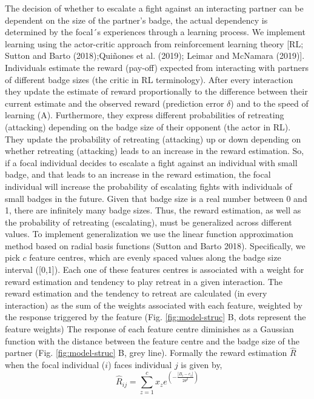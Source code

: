 \documentclass[
  12pt,
]{article}
\begin{document}
The decision of whether to escalate a fight against an interacting
partner can be dependent on the size of the partner's badge, the actual
dependency is determined by the focal´s experiences through a learning
process. We implement learning using the actor-critic approach from
reinforcement learning theory {[}RL; Sutton and Barto (2018);Quiñones et
al. (2019); Leimar and McNamara (2019){]}. Individuals estimate the
reward (pay-off) expected from interacting with partners of different
badge sizes (the critic in RL terminology). After every interaction they
update the estimate of reward proportionally to the difference between
their current estimate and the observed reward (prediction error
\(\delta\)) and to the speed of learning (\(\mathrm{A}\)). Furthermore,
they express different probabilities of retreating (attacking) depending
on the badge size of their opponent (the actor in RL). They update the
probability of retreating (attacking) up or down depending on whether
retreating (attacking) leads to an increase in the reward estimation.
So, if a focal individual decides to escalate a fight against an
individual with small badge, and that leads to an increase in the reward
estimation, the focal individual will increase the probability of
escalating fights with individuals of small badges in the future. Given
that badge size is a real number between 0 and 1, there are infinitely
many badge sizes. Thus, the reward estimation, as well as the
probability of retreating (escalating), must be generalized across
different values. To implement generalization we use the linear function
approximation method based on radial basis functions (Sutton and Barto
2018). Specifically, we pick \(c\) feature centres, which are evenly
spaced values along the badge size interval ({[}0,1{]}). Each one of
these features centres is associated with a weight for reward estimation
and tendency to play retreat in a given interaction. The reward
estimation and the tendency to retreat are calculated (in every
interaction) as the sum of the weights associated with each feature,
weighted by the response triggered by the feature (Fig.
\ref{fig:model-struc} B, dots represent the feature weights) The
response of each feature centre diminishes as a Gaussian function with
the distance between the feature centre and the badge size of the
partner (Fig. \ref{fig:model-struc} B, grey line). Formally the reward
estimation \(\hat{R}\) when the focal individual (\(i\)) faces
individual \(j\) is given by,\\
\begin{equation}
\hat{R}_{ij} =  \sum_{z=1}^{c} x_z e^{(-\frac{|B_i-c_z|}{2\theta^2})} 
\end{equation}
\end{document}
